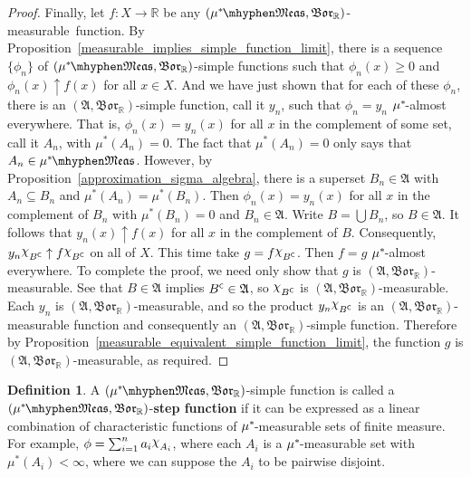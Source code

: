 \documentclass[
twoside=true,
paper=letter,
fontsize=11pt,
pagesize=auto,
leqno,
openany,
headsepline,
overfullrule,
]{scrbook}
\theoremstyle{plain}
\theoremstyle{plain}
\theoremstyle{definition}
\newtheorem{defn}[thm]{Definition}
\theoremstyle{bfnoteitalic}
\theoremstyle{bfnoteroman}
\newcommand{\term}[1]{\textbf{#1}\index{#1}}
\newcommand{\sigalg}[1]{\mathfrak{#1}}
\newcommand{\borel}{\mathfrak{Bor}}
\newcommand{\charfunction}[1]{{\raisebox{2pt}{$\chi$}}_{#1}}
\newcommand{\comp}{^{\hbox{\tiny{$\mathsf C$}}}}
\newcommand{\R}{\mathbb{R}}
\newcommand{\sigmaalgebra}{\sigalg{A}}
\newcommand{\measurable}[1]{{#1}\mhyphen\mathfrak{Meas}}
\newcommand{\kernast}{\ast\kern-1pt}
\newcommand{\mbmeasurable}{$(\measurable{\measure^\kernast},\borel_\R)$\hyp{}measurable}
\newcommand{\measurespace}{X}
\newcommand{\mspaceeltii}{y}
\newcommand{\measure}{\mu}
\begin{document}
\begin{proof}
Finally, let $f:\measurespace\to\R$ be any \mbmeasurable\ function.
By Proposition~\ref{measurable_implies_simple_function_limit}, there is a sequence $\{ \phi_n \}$ of $(\measurable{\measure^\kernast},\borel_\R)$-simple functions such that $\phi_n(x)\geq 0$ and $\phi_n(x)\uparrow f(x)$ for all $x\in\measurespace$.
And we have just shown that for each of these $\phi_n$, there is an $(\sigmaalgebra,\borel_\R)$-simple function, call it $\mspaceeltii_n$, such that $\phi_n = \mspaceeltii_n$  $\measure^\kernast$-almost everywhere. That is, $\phi_n(x) = \mspaceeltii_n(x)$ for all $x$ in the complement of some set, call it $A_n$, with $\measure^*(A_n) = 0$. 
The fact that $\measure^*(A_n)=0$ only says that $A_n\in\measurable{\measure^\kernast}$.
However, by Proposition~\ref{approximation_sigma_algebra}, there is a superset $B_n\in \sigmaalgebra$ with $A_n\subseteq B_n$ and $\measure^*(A_n) = \measure^*(B_n)$.
Then $\phi_n(x) = \mspaceeltii_n(x)$ for all $x$ in the complement of $B_n$ with $\measure^*(B_n) = 0$ and $B_n\in\sigmaalgebra$. 
Write $B=\bigcup B_n$, so $B\in\sigmaalgebra$.  
It follows that $\mspaceeltii_n(x) \uparrow f(x)$ for all $x$ in the complement of $B$. Consequently, $\mspaceeltii_n \charfunction{B\comp} \uparrow f \charfunction{B\comp}$ on all of $\measurespace$. This time take $g=f \charfunction{B\comp}$. Then $f = g$ $\measure^\kernast$-almost everywhere. To complete the proof, we need only show that $g$ is $(\sigmaalgebra,\borel_\R)$\hyp{}measurable. See that $B\in\sigmaalgebra$ implies $B\comp\in\sigmaalgebra$, so $\charfunction{B\comp}$ is $(\sigmaalgebra,\borel_\R)$\hyp{}measurable. Each $\mspaceeltii_n$ is $(\sigmaalgebra,\borel_\R)$\hyp{}measurable, and so the product $\mspaceeltii_n \charfunction{B\comp}$ is an $(\sigmaalgebra,\borel_\R)$\hyp{}measurable function and consequently an $(\sigmaalgebra,\borel_\R)$-simple function. Therefore by Proposition~\ref{measurable_equivalent_simple_function_limit}, the function $g$ is $(\sigmaalgebra,\borel_\R)$\hyp{}measurable, as required.
\end{proof}



\begin{defn}\label{step_function}
A $(\measurable{\measure^\kernast}, \borel_\R)$\hyp{}simple function is called a 
$(\measurable{\measure^\kernast},\borel_\R)$\hyp{}\term{step function} if it can be expressed as a linear combination of characteristic functions of $\measure^\kernast$\hyp{}measurable sets of finite measure.  For example, $\phi=\sum_{i=1}^n a_i\charfunction{A_i}$, where each $A_i$ is a $\measure^\kernast$-measurable set with $\measure^*(A_i) < \infty$, where we can suppose the $A_i$ to be pairwise disjoint.
\end{defn}
\end{document}
